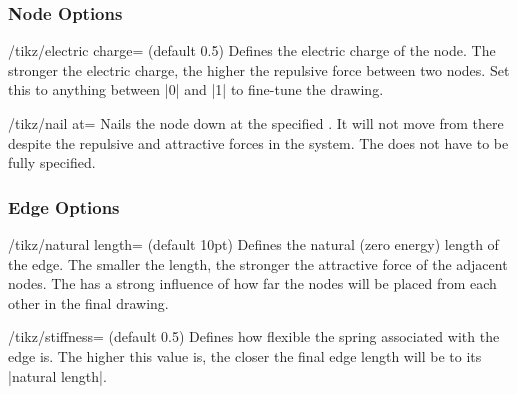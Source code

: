 \subsubsection{Node Options}

\begin{key}{/tikz/electric charge= (default 0.5)}
  Defines the electric charge of the node. The stronger the electric
  charge, the higher the repulsive force between two nodes. Set this to
  anything between |0| and |1| to fine-tune the drawing.
  \begin{codeexample}[] 
  \end{codeexample}
\end{key}

\begin{key}{/tikz/nail at=}
  Nails the node down at the specified . It will not
  move from there despite the repulsive and attractive forces in the
  system. The  does not have to be fully specified. 
  \begin{codeexample}[] 
  \end{codeexample}
\end{key}


\subsubsection{Edge Options}

\begin{key}{/tikz/natural length= (default 10pt)}
  Defines the natural (zero energy) length of the edge. The smaller the
  length, the stronger the attractive force of the adjacent nodes. The
   has a strong influence of how far the nodes will be
  placed from each other in the final drawing.
  \begin{codeexample}[]
  \end{codeexample}
\end{key}

\begin{key}{/tikz/stiffness= (default 0.5)}
  Defines how flexible the spring associated with the edge is. The
  higher this value is, the closer the final edge length will be to its
  |natural length|.
  \begin{codeexample}[]
  \end{codeexample}
\end{key}

